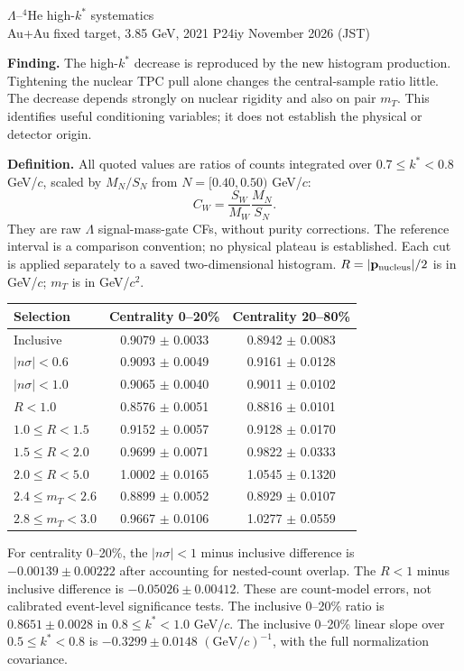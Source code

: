 \documentclass[10pt,a4paper]{article}
\begin{document}
\begin{center}{\Large $\Lambda$--$^4$He high-$k^*$ systematics}\\[4pt]
Au+Au fixed target, 3.85 GeV, 2021 P24iy  November 2026 (JST)\end{center}
\textbf{Finding.} The high-$k^*$ decrease is reproduced by the new histogram production.
Tightening the nuclear TPC pull alone changes the central-sample ratio little.
The decrease depends strongly on nuclear rigidity and also on pair $m_T$.
This identifies useful conditioning variables; it does not establish the physical or detector origin.

\textbf{Definition.} All quoted values are ratios of counts integrated over $0.7\leq k^*<0.8$ GeV/$c$,
scaled by $M_N/S_N$ from $N=[0.40,0.50)$ GeV/$c$:
\[ C_W=\frac{S_W}{M_W}\frac{M_N}{S_N}. \]
They are raw $\Lambda$ signal-mass-gate CFs, without purity corrections.
The reference interval is a comparison convention; no physical plateau is established.
Each cut is applied separately to a saved two-dimensional histogram.
$R=|\mathbf p_{\rm nucleus}|/2$ is in GeV/$c$; $m_T$ is in GeV/$c^2$.

\begin{center}\begin{tabular}{lcc}\toprule
Selection & Centrality 0--20\% & Centrality 20--80\%\\\midrule
Inclusive & 0.9079 $\pm$ 0.0033 & 0.8942 $\pm$ 0.0083 \\
$|n\sigma|<0.6$ & 0.9093 $\pm$ 0.0049 & 0.9161 $\pm$ 0.0128 \\
$|n\sigma|<1.0$ & 0.9065 $\pm$ 0.0040 & 0.9011 $\pm$ 0.0102 \\
$R<1.0$ & 0.8576 $\pm$ 0.0051 & 0.8816 $\pm$ 0.0101 \\
$1.0\leq R<1.5$ & 0.9152 $\pm$ 0.0057 & 0.9128 $\pm$ 0.0170 \\
$1.5\leq R<2.0$ & 0.9699 $\pm$ 0.0071 & 0.9822 $\pm$ 0.0333 \\
$2.0\leq R<5.0$ & 1.0002 $\pm$ 0.0165 & 1.0545 $\pm$ 0.1320 \\
$2.4\leq m_T<2.6$ & 0.8899 $\pm$ 0.0052 & 0.8929 $\pm$ 0.0107 \\
$2.8\leq m_T<3.0$ & 0.9667 $\pm$ 0.0106 & 1.0277 $\pm$ 0.0559 \\
\bottomrule\end{tabular}\end{center}

For centrality 0--20\%, the $|n\sigma|<1$ minus inclusive difference is
$-0.00139\pm0.00222$ after accounting for nested-count overlap.
The $R<1$ minus inclusive difference is $-0.05026\pm0.00412$.
These are count-model errors, not calibrated event-level significance tests.
The inclusive 0--20\% ratio is $0.8651\pm0.0028$ in $0.8\leq k^*<1.0$ GeV/$c$.
The inclusive 0--20\% linear slope over $0.5\leq k^*<0.8$ is
$-0.3299\pm0.0148$ $(\mathrm{GeV}/c)^{-1}$, with the full normalization covariance.
\end{document}
